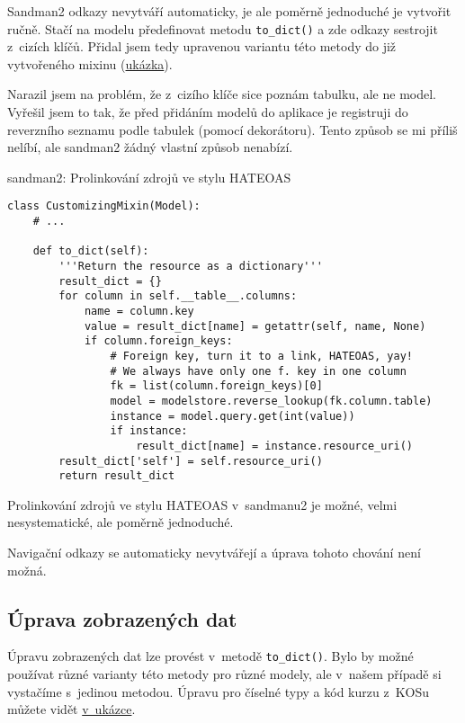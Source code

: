 Sandman2 odkazy nevytváří automaticky, je ale poměrně jednoduché je vytvořit ručně. Stačí na modelu předefinovat metodu \verb!to_dict()! a zde odkazy sestrojit z~cizích klíčů. Přidal jsem tedy upravenou variantu této metody do již vytvořeného mixinu (\protect\hyperlink{code:sandman2:links}{ukázka}).

Narazil jsem na problém, že z~cizího klíče sice poznám tabulku, ale ne model. Vyřešil jsem to tak, že před přidáním modelů do aplikace je registruji do reverzního seznamu podle tabulek (pomocí dekorátoru). Tento způsob se mi příliš nelíbí, ale sandman2 žádný vlastní způsob nenabízí.

\begin{listing}[htbp]
\caption{{\label{code:sandman2:links}sandman2: Prolinkování zdrojů ve stylu HATEOAS}}
\begin{verbatim}
class CustomizingMixin(Model):
    # ...

    def to_dict(self):
        '''Return the resource as a dictionary'''
        result_dict = {}
        for column in self.__table__.columns:
            name = column.key
            value = result_dict[name] = getattr(self, name, None)
            if column.foreign_keys:
                # Foreign key, turn it to a link, HATEOAS, yay!
                # We always have only one f. key in one column
                fk = list(column.foreign_keys)[0]
                model = modelstore.reverse_lookup(fk.column.table)
                instance = model.query.get(int(value))
                if instance:
                    result_dict[name] = instance.resource_uri()
        result_dict['self'] = self.resource_uri()
        return result_dict
\end{verbatim}
\end{listing}

Prolinkování zdrojů ve stylu HATEOAS v~sandmanu2 je možné, velmi nesystematické, ale poměrně jednoduché.

Navigační odkazy se automaticky nevytvářejí a úprava tohoto chování není možná.

\subsection{Úprava zobrazených dat}\label{uxfaprava-zobrazenuxfdch-dat}

Úpravu zobrazených dat lze provést v~metodě \verb!to_dict()!. Bylo by možné používat různé varianty této metody pro různé modely, ale v~našem případě si vystačíme s~jedinou metodou. Úpravu pro číselné typy a kód kurzu z~KOSu můžete vidět \protect\hyperlink{code:sandman2:modify}{v~ukázce}.

